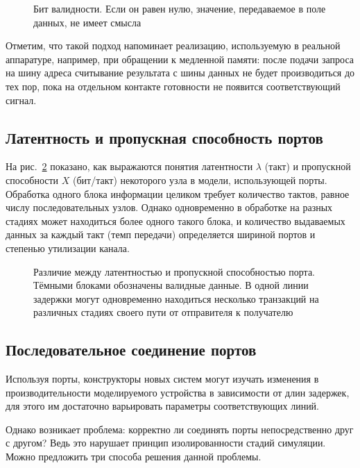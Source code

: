 \begin{figure}[htbp]
    \centering
    \caption[Бит валидности]{Бит валидности. Если он равен нулю, значение, передаваемое в поле данных, не имеет смысла}
    \label{fig:valid}
\end{figure}

Отметим, что такой подход напоминает реализацию, используемую в реальной аппаратуре, например, при обращении к медленной памяти: после подачи запроса на шину адреса считывание результата с шины данных не будет производиться до тех пор, пока на отдельном контакте готовности не появится соответствующий сигнал.

\subsection{Латентность и пропускная способность портов}

На рис.~\ref{fig:latency-bandwidth} показано, как выражаются понятия латентности $\lambda$ (такт) и пропускной способности $X$ (бит/такт) некоторого узла в модели, использующей порты. Обработка одного блока информации целиком требует количество тактов, равное числу последовательных узлов. Однако одновременно в обработке на разных стадиях может находиться более одного такого блока, и количество выдаваемых данных за каждый такт (темп передачи)  определяется шириной портов и степенью утилизации канала.

\begin{figure}[htbp]
    \centering
    \caption[Латентность и пропускная способность порта]{Различие между латентностью и пропускной способностью порта. Тёмными блоками обозначены валидные данные. В одной линии задержки могут одновременно находиться несколько транзакций на различных стадиях своего пути от отправителя к получателю}
    \label{fig:latency-bandwidth}
\end{figure}


\subsection{Последовательное соединение портов}

Используя порты, конструкторы новых систем могут изучать изменения в производительности моделируемого устройства в зависимости от длин задержек, для этого им достаточно варьировать параметры соответствующих линий.

Однако возникает проблема: корректно ли соединять порты непосредственно друг с другом? Ведь это нарушает принцип изолированности стадий симуляции. 
Можно предложить три способа решения данной проблемы.

